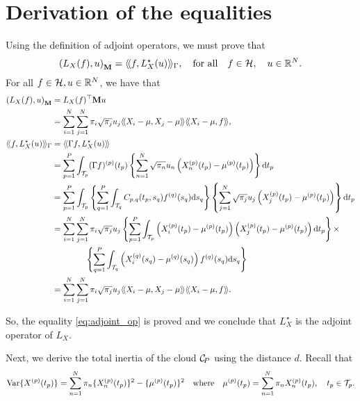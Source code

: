\section{Derivation of the equalities} %
\label{sec:derivation_of_the_inertia_of_the_clouds}

Using the definition of adjoint operators, we must prove that
\begin{equation}\label{eq:adjoint_op}
    \left(L_X(f), u\right)_{\mathbf{M}} = \langle\!\langle f, L^\star_X(u)\rangle\!\rangle_\Gamma, \quad\text{for all}\quad f \in \mathcal{H},\quad u \in \mathbb{R}^N.
\end{equation}
For all $f \in \mathcal{H}, u \in \mathbb{R}^N$, we have that
\begin{align*}
    \inRM{L_X(f)}{u} &= L_X(f)^\top \mathbf{M} u \\
    &= \sum_{i = 1}^N\sum_{j = 1}^N \pi_i \sqrt{\pi_j} u_j \inH{X_i - \mu}{X_j - \mu}\inH{X_i - \mu}{f}, \\
    \inHG{f}{L^\star_X(u)} &= \inH{\Gamma f}{L^\star_X(u)} \\
    &= \sum_{p = 1}^P \int_{\TT{p}} (\Gamma f)^{(p)}(t_p) \left\{ \sum_{n = 1}^N \sqrt{\pi_n} u_n \left(\Xnp(t_p) - \mup{p}(t_p)\right) \right\} \dd t_p \\
    &= \sum_{p = 1}^P \int_{\TT{p}} \left\{\sum_{q = 1}^P \int_{\TT{q}} C_{p,q}(t_p, s_q)f^{(q)}(s_q) \dd s_q\right\} \left\{ \sum_{j = 1}^N \sqrt{\pi_j} u_j \left(X_j^{(p)}(t_p) - \mup{p}(t_p)\right) \right\} \dd t_p \\
    &= \sum_{i = 1}^N \sum_{j = 1}^N \pi_i \sqrt{\pi_j} u_j \left\{\sum_{p = 1}^P \int_{\TT{p}} \left(X_i^{(p)}(t_p) - \mup{p}(t_p)\right)\left(X_j^{(p)}(t_p) - \mup{p}(t_p)\right)\dd t_p\right\} \times \\
    &\qquad\qquad \left\{\sum_{q = 1}^P \int_{\TT{q}} \left(X_i^{(q)}(s_q) - \mup{q}(s_q)\right)f^{(q)}(s_q)\dd s_q\right\} \\
    &= \sum_{i = 1}^N\sum_{j = 1}^N \pi_i \sqrt{\pi_j} u_j \inH{X_i - \mu}{X_j - \mu}\inH{X_i - \mu}{f}.
\end{align*}

So, the equality \eqref{eq:adjoint_op} is proved and we conclude that $L^\star_X$ is the adjoint operator of $L_X$.

Next, we derive the total inertia of the cloud $\mathcal{C}_{\!P}$ using the distance $d$. Recall that 
\begin{equation}\label{eq:var_appendix}
    \operatorname{Var}\{X^{(p)}(t_p)\} = \sum_{n = 1}^N \pi_n \{X_n^{(p)}(t_p)\}^2 - \{\mu^{(p)}(t_p)\}^2 \quad\text{where}\quad \mu^{(p)}(t_p) = \sum_{n = 1}^N \pi_nX_n^{(p)}(t_p), \quad t_p \in \mathcal{T}_{p}.
\end{equation}

